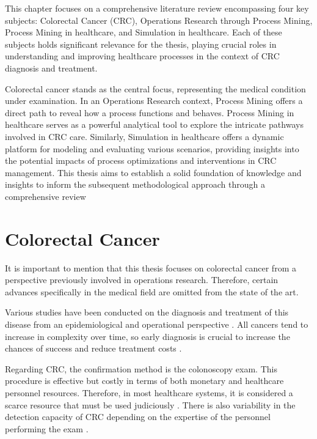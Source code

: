 This chapter focuses on a comprehensive literature review encompassing four key subjects: Colorectal Cancer (CRC), Operations Research through Process Mining, Process Mining in healthcare, and Simulation in healthcare. Each of these subjects holds significant relevance for the thesis, playing crucial roles in understanding and improving healthcare processes in the context of CRC diagnosis and treatment.

Colorectal cancer stands as the central focus, representing the medical condition under examination. In an Operations Research context, Process Mining offers a direct path to reveal how a process functions and behaves. Process Mining in healthcare serves as a powerful analytical tool to explore the intricate pathways involved in CRC care. Similarly, Simulation in healthcare offers a dynamic platform for modeling and evaluating various scenarios, providing insights into the potential impacts of process optimizations and interventions in CRC management. This thesis aims to establish a solid foundation of knowledge and insights to inform the subsequent methodological approach through a comprehensive review

\section{Colorectal Cancer}

It is important to mention that this thesis focuses on colorectal cancer from a perspective previously involved in operations research. Therefore, certain advances specifically in the medical field are omitted from the state of the art.

Various studies have been conducted on the diagnosis and treatment of this disease from an epidemiological \cite{marley_epidemiology_2016} and operational perspective \cite{lieberman_screening_2009, vega_colorectal_2015, wolpin_systemic_2008}. All cancers tend to increase in complexity over time, so early diagnosis is crucial to increase the chances of success and reduce treatment costs \cite{kakushadze_estimating_2017}.

Regarding CRC, the confirmation method is the colonoscopy exam. This procedure is effective but costly in terms of both monetary and healthcare personnel resources. Therefore, in most healthcare systems, it is considered a scarce resource that must be used judiciously \cite{kolligs_diagnostics_2016}. There is also variability in the detection capacity of CRC depending on the expertise of the personnel performing the exam \cite{okada_international_2016}.

